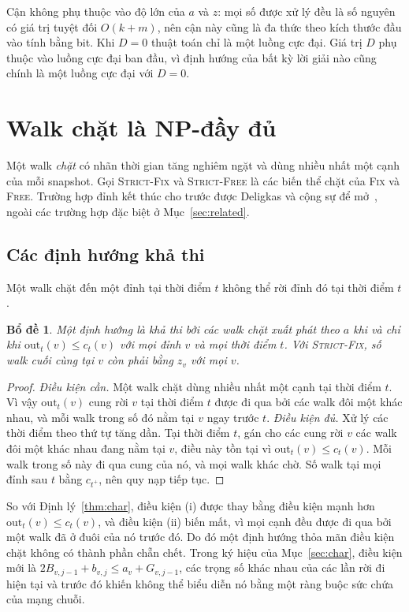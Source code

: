 \documentclass[pdflatex,sn-mathphys-num]{sn-jnl}
\theoremstyle{thmstyleone}
\newtheorem{lemma}[theorem]{Bổ đề}
\theoremstyle{thmstyletwo}
\theoremstyle{thmstylethree}
\newcommand{\out}{\mathrm{out}}
\newcommand{\FIX}{\textup{\textsc{Fix}}}
\newcommand{\FREE}{\textup{\textsc{Free}}}
\newcommand{\SFIX}{\textup{\textsc{Strict-Fix}}}
\newcommand{\SFREE}{\textup{\textsc{Strict-Free}}}
\begin{document}
Cận không phụ thuộc vào độ lớn của $a$ và $z$: mọi số được xử lý đều là số nguyên có giá trị tuyệt đối $O(k+m)$, nên cận này cũng là đa thức theo kích thước đầu vào tính bằng bit. Khi $D=0$ thuật toán chỉ là một luồng cực đại. Giá trị $D$ phụ thuộc vào luồng cực đại ban đầu, vì định hướng của bất kỳ lời giải nào cũng chính là một luồng cực đại với $D=0$.

\section{Walk chặt là NP-đầy đủ}\label{sec:strict}

Một walk \emph{chặt} có nhãn thời gian tăng nghiêm ngặt và dùng nhiều nhất một cạnh của mỗi snapshot. Gọi \SFIX{} và \SFREE{} là các biến thể chặt của \FIX{} và \FREE{}. Trường hợp đỉnh kết thúc cho trước được Deligkas và cộng sự để mở~\cite[p.~26504]{deligkas2025}, ngoài các trường hợp đặc biệt ở Mục~\ref{sec:related}.

\subsection{Các định hướng khả thi}

Một walk chặt đến một đỉnh tại thời điểm $t$ không thể rời đỉnh đó tại thời điểm $t$.

\begin{lemma}\label{lem:strict}
Một định hướng là khả thi bởi các walk chặt xuất phát theo $a$ khi và chỉ khi $\out_t(v)\le c_t(v)$ với mọi đỉnh $v$ và mọi thời điểm $t$. Với \SFIX{}, số walk cuối cùng tại $v$ còn phải bằng $z_v$ với mọi $v$.
\end{lemma}

\begin{proof}
\emph{Điều kiện cần.} Một walk chặt dùng nhiều nhất một cạnh tại thời điểm $t$. Vì vậy $\out_t(v)$ cung rời $v$ tại thời điểm $t$ được đi qua bởi các walk đôi một khác nhau, và mỗi walk trong số đó nằm tại $v$ ngay trước $t$. \emph{Điều kiện đủ.} Xử lý các thời điểm theo thứ tự tăng dần. Tại thời điểm $t$, gán cho các cung rời $v$ các walk đôi một khác nhau đang nằm tại $v$, điều này tồn tại vì $\out_t(v)\le c_t(v)$. Mỗi walk trong số này đi qua cung của nó, và mọi walk khác chờ. Số walk tại mọi đỉnh sau $t$ bằng $c_{t^+}$, nên quy nạp tiếp tục.
\end{proof}

So với Định lý~\ref{thm:char}, điều kiện (i) được thay bằng điều kiện mạnh hơn $\out_t(v)\le c_t(v)$, và điều kiện (ii) biến mất, vì mọi cạnh đều được đi qua bởi một walk đã ở đuôi của nó trước đó. Do đó một định hướng thỏa mãn điều kiện chặt không có thành phần chẵn chết. Trong ký hiệu của Mục~\ref{sec:char}, điều kiện mới là $2B_{v,j-1}+b_{v,j}\le a_v+G_{v,j-1}$, các trọng số khác nhau của các lần rời đi hiện tại và trước đó khiến không thể biểu diễn nó bằng một ràng buộc sức chứa của mạng chuỗi.
\end{document}
